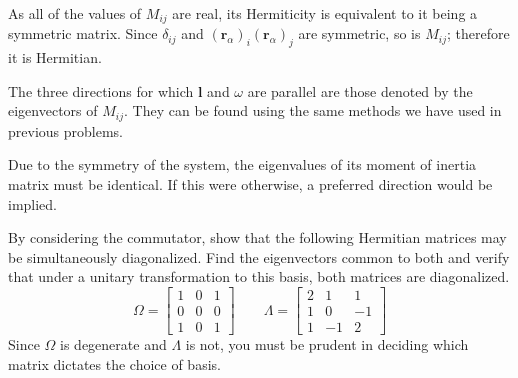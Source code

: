 \documentclass[../principles-of-quantum-mechanics.tex]{subfiles}
\begin{document}
\begin{questions}
\begin{solution}
	As all of the values of $M_{ij}$ are real, its Hermiticity is equivalent to it being a symmetric matrix. Since $\delta_{ij}$ and $(\mathbf{r}_\alpha)_i(\mathbf{r}_\alpha)_j$ are symmetric, so is $M_{ij}$; therefore it is Hermitian.
	
	The three directions for which $\mathbf{l}$ and $\omega$ are parallel are those denoted by the eigenvectors of $M_{ij}$. They can be found using the same methods we have used in previous problems.
	
	Due to the symmetry of the system, the eigenvalues of its moment of inertia matrix must be identical. If this were otherwise, a preferred direction would be implied.
\end{solution}

\question By considering the commutator, show that the following Hermitian matrices may be simultaneously diagonalized. Find the eigenvectors common to both and verify that under a unitary transformation to this basis, both matrices are diagonalized.
\[
	\Omega = \begin{bmatrix}1 & 0 & 1 \\ 0 & 0 & 0 \\ 1 & 0 & 1\end{bmatrix} \qquad \Lambda = \begin{bmatrix}2 & 1 & 1 \\ 1 & 0 & -1 \\ 1 & -1 & 2\end{bmatrix}
\]
Since $\Omega$ is degenerate and $\Lambda$ is not, you must be prudent in deciding which matrix dictates the choice of basis.


\end{questions}
\end{document}
